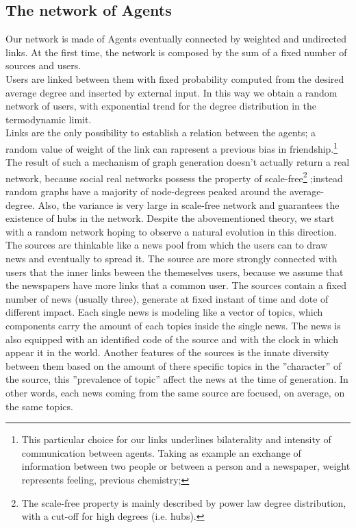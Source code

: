 \documentclass[11pt]{article} %
\begin{document}
\subsection{The network of Agents}
Our network is made of Agents eventually connected by weighted and undirected links.
At the first time, the network is composed by the sum of a fixed number of sources and users. \\
Users are linked between them with fixed probability computed from the desired average degree and inserted by external input.
 In this way we obtain a random network of users, with exponential trend for the degree distribution in the termodynamic limit.
\\ Links are the only possibility to establish a relation between the agents; a random value of weight of the link can rapresent a previous bias in 
friendship.\footnote{This particular choice for our links underlines bilaterality and intensity of communication between agents.
Taking as example an exchange of information between two people or between a person and a newspaper, weight represents feeling, previous chemistry;}
The result of such a mechanism of graph generation doesn't actually return a real network, because social real networks possess the property of 
scale-free\footnote{The scale-free property is mainly described by power law degree distribution, with a cut-off for high degrees (i.e. hubs). }
 ;instead random graphs have a majority of node-degrees peaked around the average-degree. 
Also, the variance is very large in scale-free network and guarantees the existence of hubs in the network.
Despite the abovementioned theory, we start with a random network hoping to observe a natural evolution in this direction.
\\
The sources are thinkable like a news pool from which the users can to draw news and eventually to spread it. The source are more strongly connected with users that the inner links beween the themeselves users, because we assume that the newspapers have more links that a common user.
The sources contain a fixed number of news (usually three), generate at fixed instant of time and dote of different impact. Each single news is modeling like a vector of topics, which components carry the amount of each topics inside the single news. The news is also equipped with an identified code of the source and with the clock in which appear it in the world. 
Another features of the sources is the innate diversity between them based on the amount of there specific topics in the ''character'' of the source, this ''prevalence of topic'' affect the news at the time of generation. In other words, each news coming from the same source are focused, on average, on the same topics. \\
\end{document}
